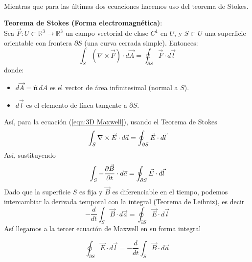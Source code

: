 \documentclass{electro}
\begin{document}
    Mientras que para las últimas dos ecuaciones hacemos uso del teorema de Stokes.
    
    \begin{tcolorbox}[colframe=white, colback=principaluno!40, arc=8pt, left=2mm, right=2mm, top=2mm, bottom=2mm]
    \textbf{Teorema de Stokes (Forma electromagnética)}:\\
    Sea $\vec{F}: U \subset \mathbb{R}^3 \rightarrow \mathbb{R}^3$ un campo vectorial de clase $C^1$ en $U$, y $S \subset U$ una superficie orientable con frontera $\partial S$ (una curva cerrada simple). Entonces:
    \[\int_S (\nabla \times \vec{F}) \cdot d\vec{A} = \oint_{\partial S} \vec{F} \cdot d\vec{l}\]
    donde:
    \begin{itemize}
    \item $d\vec{A} = \mathbf{\hat{n}} \, dA$ es el vector de área infinitesimal (normal a $S$).
    \item $d\vec{l}$ es el elemento de línea tangente a $\partial S$.
    \end{itemize}
    \end{tcolorbox}

    Así, para la ecuación (\ref{eqn:3D Maxwell}), usando el Teorema de Stokes
    \[\int_{S} \nabla \times{\vec{E}} \cdot d\vec{a}=\oint_{\partial S}\vec{E} \cdot d\vec{l}\]
    Así, sustituyendo
    \[\int_S -\frac{\partial \vec{B}}{\partial t} \cdot d\vec{a} = \oint_{\partial S} \vec{E} \cdot d \vec{l}\]
    Dado que la superficie $S$ es fija y $\vec{B}$ es diferenciable en el tiempo, podemos intercambiar la derivada temporal con la integral (Teorema de Leibniz), es decir
    \[-\frac{d}{dt}\int_S \vec{B} \cdot d\vec{a} = \oint_{\partial S} \vec{E} \cdot d\vec{l}\]
    Así llegamos a la tercer ecuación de Maxwell en su forma integral
    \begin{tcolorbox}[colframe=white, colback=secdos!40, arc=8pt, left=2mm, right=2mm, top=2mm, bottom=2mm]
    \begin{equation}
        \oint_{\partial S} \vec{E} \cdot d\vec{l}=-\frac{d}{dt}\int_S \vec{B} \cdot d\vec{a}
        \tag{Maxwell-Faraday}
    \end{equation}
    \end{tcolorbox}
    
\end{document}

